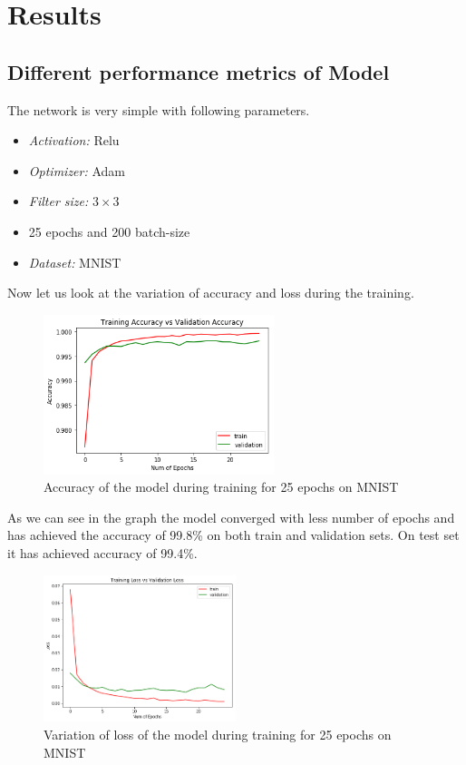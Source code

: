 \chapter{Results}\label{chap:results}
 \section{Different performance metrics of Model}
The network is very simple with following parameters.
 \begin{itemize}
     \item \textit{Activation:} Relu
     \item \textit{Optimizer:} Adam
     \item \textit{Filter size:} $3 \times 3 $
     \item  25 epochs and 200 batch-size
     \item \textit{Dataset:} MNIST
\end{itemize}
 Now let us look at the variation of accuracy and loss during the training.
 
\begin{figure}[h]
    \centering
    \includegraphics[width=0.6\textwidth]{thesis_template/images/accmnist.png}
    \caption{\small Accuracy of the model during training for 25 epochs on MNIST}
    \label{}
    \end{figure} 
    
\noindent As we can see in the graph the model converged with less number of epochs and has achieved the accuracy of 99.8\% on both train and validation sets. On test set it has achieved accuracy of 99.4\%.
    \begin{figure}[h]
    \centering
    \includegraphics[width=0.5\textwidth]{thesis_template/images/lossmnist.png}
    \caption{\small Variation of loss of the model during training for 25 epochs on MNIST}
    \label{}
    \end{figure}    

